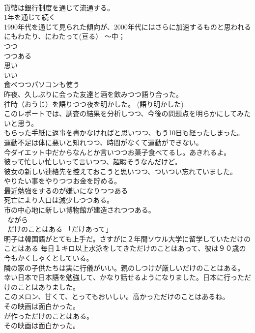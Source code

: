 \documentclass[8pt]{extreport}
\begin{document}
\begin{CJK}{UTF8}{min}
\\	貨幣は銀行制度を通じて流通する。 
\\	1年を通じて続く 
\\	1990年代を通じて見られた傾向が、2000年代にはさらに加速するものと思われる 
\\	にもわたり、にわたって(亘る） ～中；
\\	つつ 
\\	つつある	
\\	思い 
\\	いい 
\\	食べつつパソコンも使う 
\\	昨夜、久しぶりに会った友達と酒を飲みつつ語り合った。 
\\	往時（おうじ）を語りつつ夜を明かした。 (語り明かした) 
\\	このレポートでは、調査の結果を分析しつつ、今後の問題点を明らかにしてみたいと思う。 
\\	もらった手紙に返事を書かなければと思いつつ、もう10日も経ったしまった。 
\\	運動不足は体に悪いと知れつつ、時間がなくて運動ができない。 
\\	今ダイエット中だからなんとか言いつつお菓子食べてるし。あきれるよ。　
\\	彼って忙しい忙しいって言いつつ、超暇そうなんだけど。 
\\	彼女の新しい連絡先を控えておこうと思いつつ、ついつい忘れていました。 
\\	やりたい事をやりつつお金を貯める。　　
\\	最近勉強をするのが嫌いになりつつある 
\\	死亡により人口は減少しつつある。
\\	市の中心地に新しい博物館が建造されつつある。 
\\	~ながら
\\	~だけのことはある 「だけあって」	
\\	明子は韓国語がとても上手だ。さすがに２年間ソウル大学に留学していただけのことはある 毎日１キロ以上水泳をしてきただけのことはあって、彼は９０歳の今もかくしゃくとしている。
\\	隣の家の子供たちは実に行儀がいい。親のしつけが厳しいだけのことはある。 幸い日本で日本語を勉強して、かなり話せるようになりました。日本に行っただけのことはありました。
\\	このメロン、甘くて、とってもおいしい。高かっただけのことはあるね。 
\\	その映画は面白かった。
\\	が作っただけのことはある。 
\\	その映画は面白かった。

\end{CJK}
\end{document}
